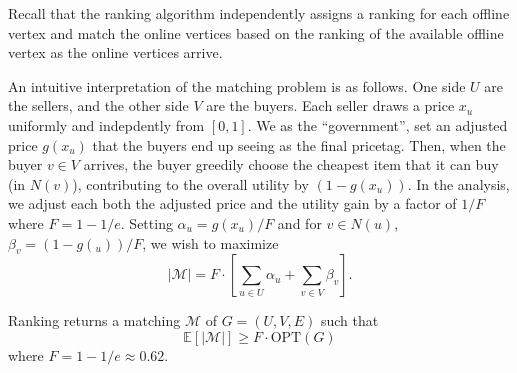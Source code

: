 



Recall that the ranking algorithm independently assigns a ranking for each offline vertex and match the online vertices based on the ranking of the available offline vertex as the online vertices arrive.

An intuitive interpretation of the matching problem is as follows. One side $U$ are the sellers, and the other side $V$ are the buyers. Each seller draws a price $x_u$ uniformly and indepdently from $[0,1]$. We as the ``government'', set an adjusted price $g(x_u)$ that the buyers end up seeing as the final pricetag. Then, when the buyer $v \in V$ arrives, the buyer greedily choose the cheapest item that it can buy (in $N(v)$), contributing to the overall utility by $(1-g(x_u))$. In the analysis, we adjust each both the adjusted price and the utility gain by a factor of $1/F$ where $F = 1-1/e$. Setting $\alpha_u = g(x_u)/F$ and for $v \in N(u)$, $\beta_v = (1-g(_u))/F$, we wish to maximize
\label{eq:online-matching-objective}
\begin{equation}
    |\mathcal{M}| = F \cdot \left[ \sum_{u \in U} \alpha_u + \sum_{v \in V} \beta_v \right].
\end{equation}

\begin{theorem}
    Ranking returns a matching $\mathcal{M}$ of $G=(U,V,E)$ such that
    $$
    \mathbb{E}[|\mathcal{M}|] \geq F \cdot \mathrm{OPT}(G)
    $$
    where $F = 1 - 1/e \approx 0.62$.
\end{theorem}

